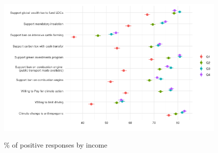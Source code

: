 	\begin{frame}{}%
	\begin{figure}[h!]
	\caption{\% of positive responses by income}
	\includegraphics[width=.7\paperwidth]{../figures/country_comparison/main_var_by_country_income_all.png} \\
	\end{figure}
	\end{frame}
	
	

